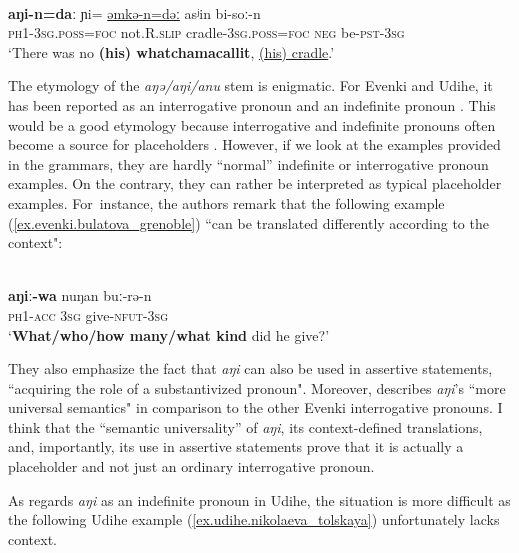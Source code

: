 \documentclass[output=paper,colorlinks,citecolor=brown
\ChapterDOI{10.5281/zenodo.15697577}
]{langscibook}
\begin{document}
 \ea 
 \label{ex.particle.evk}
 \\
 \gll \textbf{aŋi-n=daː} ɲi= \uline{əmkə-n=dəː} asʲin bi-soː-n\\
 \textsc{ph1}-\textsc{3sg.poss}=\textsc{foc} not.R.\textsc{slip} cradle-\textsc{3sg.poss}=\textsc{foc} \textsc{neg} be-\textsc{pst}-\textsc{3sg}\\
 \glt `There was no \textbf{(his) whatchamacallit}, \uline{(his) cradle}.'\\
 \z
{}


The etymology of the \textit{aŋə/aŋi/anu} stem is enigmatic. For Evenki and Udihe, it has been reported as an interrogative pronoun \citep[25]{BulatovaGrenoble1999} and an indefinite pronoun \citep[362]{nikolaeva2001grammar}. This would be a good etymology because interrogative and indefinite pronouns often become a source for placeholders \citep{Podlesskaya2010}. However, if we look at the examples provided in the grammars, they are hardly ``normal'' indefinite or interrogative pronoun examples. On the contrary, they can rather be interpreted as typical placeholder examples. For~instance, the authors remark that the following example (\ref{ex.evenki.bulatova_grenoble}) ``can be translated differently according to the context":


 \ea 
 \label{ex.evenki.bulatova_grenoble}
 \\
 \gll \textbf{aŋiː-wa} nuŋan buː-rə-n\\
\textsc{ph1}-\textsc{acc} \textsc{3sg} give-\textsc{nfut}-\textsc{3sg}\\
 \glt `\textbf{What/who/how many/what kind} did he give?'
 \z
{}

They also emphasize the fact that \textit{aŋi} can also be used in assertive statements, ``acquiring the role of a substantivized pronoun". Moreover, 
\citet{bulatova2003} describes \textit{aŋi}'s ``more universal semantics" in comparison to the other Evenki interrogative pronouns. I think that the ``semantic universality'' of \textit{aŋi}, its context-defined translations, and, importantly, its use in assertive statements prove that it is actually a placeholder and not just an ordinary interrogative pronoun.

As regards \textit{aŋi} as an indefinite pronoun in Udihe, the situation is more difficult as the following Udihe example (\ref{ex.udihe.nikolaeva_tolskaya}) unfortunately lacks context.
\end{document}
